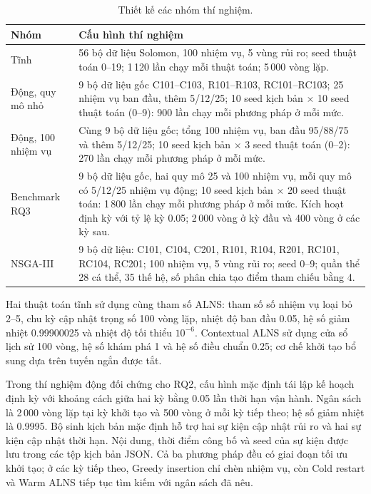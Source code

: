 \documentclass[11pt,a4paper]{article}
\begin{document}
\begin{table}[htbp]
\centering\scriptsize
\caption{Thiết kế các nhóm thí nghiệm.}
\begin{tabularx}{\linewidth}{@{}lX@{}}
\toprule
Nhóm & Cấu hình thí nghiệm\\\midrule
Tĩnh & 56 bộ dữ liệu Solomon, 100 nhiệm vụ, 5 vùng rủi ro; seed thuật toán 0--19; 1\,120 lần chạy mỗi thuật toán; 5\,000 vòng lặp.\\
Động, quy mô nhỏ & 9 bộ dữ liệu gốc C101--C103, R101--R103, RC101--RC103; 25 nhiệm vụ ban đầu, thêm 5/12/25; 10 seed kịch bản $\times$ 10 seed thuật toán (0--9): 900 lần chạy mỗi phương pháp ở mỗi mức.\\
Động, 100 nhiệm vụ & Cùng 9 bộ dữ liệu gốc; tổng 100 nhiệm vụ, ban đầu 95/88/75 và thêm 5/12/25; 10 seed kịch bản $\times$ 3 seed thuật toán (0--2): 270 lần chạy mỗi phương pháp ở mỗi mức.\\
Benchmark RQ3 & 9 bộ dữ liệu gốc, hai quy mô 25 và 100 nhiệm vụ, mỗi quy mô có 5/12/25 nhiệm vụ động; 10 seed kịch bản $\times$ 20 seed thuật toán: 1\,800 lần chạy mỗi phương pháp ở mỗi mức. Kích hoạt định kỳ với tỷ lệ kỳ 0.05; 2\,000 vòng ở kỳ đầu và 400 vòng ở các kỳ sau.\\
NSGA-III & 9 bộ dữ liệu: C101, C104, C201, R101, R104, R201, RC101, RC104, RC201; 100 nhiệm vụ, 5 vùng rủi ro; seed 0--9; quần thể 28 cá thể, 35 thế hệ, số phân chia tạo điểm tham chiếu bằng 4.\\
\bottomrule
\end{tabularx}
\end{table}

Hai thuật toán tĩnh sử dụng cùng tham số ALNS: tham số số nhiệm vụ loại bỏ 2--5, chu kỳ cập nhật trọng số 100 vòng lặp, nhiệt độ ban đầu 0.05, hệ số giảm nhiệt 0.99900025 và nhiệt độ tối thiểu $10^{-6}$. Contextual ALNS sử dụng cửa sổ lịch sử 100 vòng, hệ số khám phá 1 và hệ số điều chuẩn 0.25; cơ chế khởi tạo bổ sung dựa trên tuyến ngắn được tắt.

Trong thí nghiệm động đối chứng cho RQ2, cấu hình mặc định tái lập kế hoạch định kỳ với khoảng cách giữa hai kỳ bằng 0.05 lần thời hạn vận hành. Ngân sách là 2\,000 vòng lặp tại kỳ khởi tạo và 500 vòng ở mỗi kỳ tiếp theo; hệ số giảm nhiệt là 0.9995. Bộ sinh kịch bản mặc định hỗ trợ hai sự kiện cập nhật rủi ro và hai sự kiện cập nhật thời hạn. Nội dung, thời điểm công bố và seed của sự kiện được lưu trong các tệp kịch bản JSON. Cả ba phương pháp đều có giai đoạn tối ưu khởi tạo; ở các kỳ tiếp theo, Greedy insertion chỉ chèn nhiệm vụ, còn Cold restart và Warm ALNS tiếp tục tìm kiếm với ngân sách đã nêu.
\end{document}
